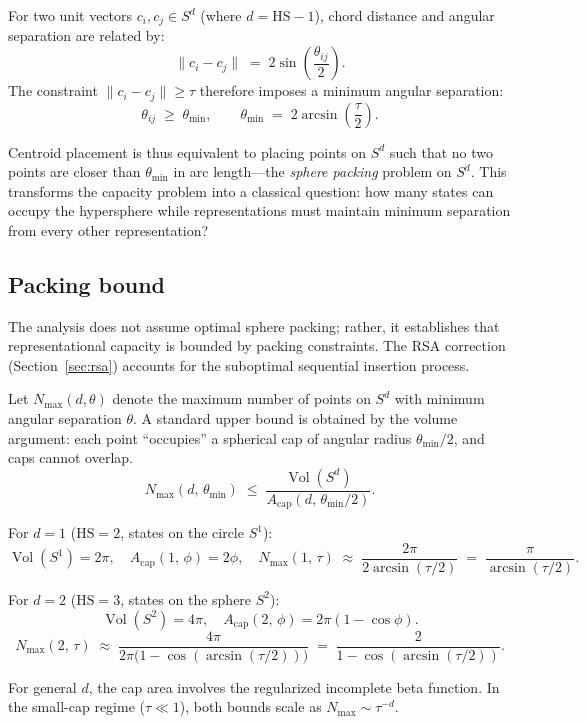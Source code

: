 \documentclass[11pt]{article}
\begin{document}
For two unit vectors $c_i, c_j \in S^{d}$ (where $d = \mathrm{HS}-1$),
chord distance and angular separation are related by:
\[
  \|c_i - c_j\| \;=\; 2\sin\!\left(\frac{\theta_{ij}}{2}\right).
\]
The constraint $\|c_i - c_j\| \geq \tau$ therefore imposes a minimum
angular separation:
\[
  \theta_{ij} \;\geq\; \theta_{\min},
  \qquad
  \theta_{\min} \;=\; 2\arcsin\!\left(\frac{\tau}{2}\right).
\]

Centroid placement is thus equivalent to placing points on $S^d$ such that
no two points are closer than $\theta_{\min}$ in arc length---the \emph{sphere packing} problem on $S^d$.
This transforms the capacity problem into a classical question: how many states can occupy the hypersphere while representations must maintain minimum separation from every other representation?

\subsection{Packing bound}

The analysis does not assume optimal sphere packing; rather, it establishes that representational capacity is bounded by packing constraints. The RSA correction (Section~\ref{sec:rsa}) accounts for the suboptimal sequential insertion process.

Let $N_{\max}(d, \theta)$ denote the maximum number of points on $S^d$ with
minimum angular separation $\theta$.
A standard upper bound is obtained by the volume argument: each point
``occupies'' a spherical cap of angular radius $\theta_{\min}/2$, and
caps cannot overlap.
\[
  N_{\max}(d,\,\theta_{\min}) \;\leq\;
  \frac{\operatorname{Vol}(S^d)}{A_{\mathrm{cap}}(d,\,\theta_{\min}/2)}.
\]

For $d = 1$ ($\mathrm{HS}=2$, states on the circle $S^1$):
\[
  \operatorname{Vol}(S^1) = 2\pi,
  \quad
  A_{\mathrm{cap}}(1,\,\phi) = 2\phi,
  \quad
  N_{\max}(1,\,\tau)
  \;\approx\;
  \frac{2\pi}{2\arcsin(\tau/2)}
  \;=\;
  \frac{\pi}{\arcsin(\tau/2)}.
  \tag{Circle}
\]

For $d = 2$ ($\mathrm{HS}=3$, states on the sphere $S^2$):
\[
  \operatorname{Vol}(S^2) = 4\pi,
  \quad
  A_{\mathrm{cap}}(2,\,\phi) = 2\pi(1 - \cos\phi).
\]
\[
  N_{\max}(2,\,\tau)
  \;\approx\;
  \frac{4\pi}{2\pi\bigl(1-\cos(\arcsin(\tau/2))\bigr)}
  \;=\;
  \frac{2}{1 - \cos(\arcsin(\tau/2))}.
  \tag{Sphere}
\]

For general $d$, the cap area involves the regularized incomplete beta function.
In the small-cap regime ($\tau \ll 1$), both bounds scale as
$N_{\max} \sim \tau^{-d}$.
\end{document}
